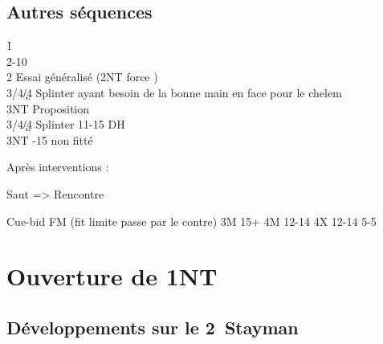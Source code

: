 \documentclass[a4paper]{article}
\begin{document}
\subsection{Autres séquences}

\begin{bidtable}
1\h\+\\
2\h {}-10\+\\
2\s \> Essai généralisé (2NT force \s )\\
3\s/4\c/4\d \> Splinter ayant besoin de la bonne main en face pour le chelem\\
3NT \> Proposition\-\\
3\s/4\c/4\d \> Splinter 11-15 DH\\
3NT -15 non fitté\-
\end{bidtable}

Après interventions :

Saut => Rencontre

Cue-bid FM (fit limite passe par le contre)
3M 15+
4M 12-14
4X 12-14 5-5

\section{Ouverture de 1NT}

\subsection{Développements sur le 2\pdfc\ Stayman}
\end{document}
